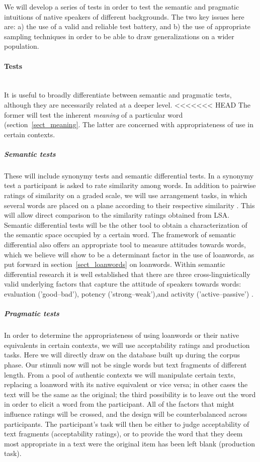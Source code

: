 \documentclass[a4paper]{article}
\begin{document}
We will develop a series of tests in order to test the semantic and pragmatic intuitions of native speakers of different backgrounds.
The two key issues here are: a) the use of a valid and reliable test battery, and b) the use of appropriate sampling techniques in order to be able to draw generalizations on a wider population.

\paragraph{Tests}
\hspace{0pt} \\
It is useful to broadly differentiate between semantic and pragmatic tests, although they are necessarily related at a deeper level.
<<<<<<< HEAD
The former will test the inherent \emph{meaning} of a particular word (section~\ref{sect_meaning}. 
The latter are concerned with appropriateness of use in certain contexts.

\subparagraph{Semantic tests}
These will include synonymy tests and semantic differential tests.
In a synonymy test a participant is asked to rate similarity among words.
In addition to pairwise ratings of similarity on a graded scale, we will use arrangement tasks, in which several words are placed on a plane according to their respective similarity \citep{Goldstone1994, Kriegeskorte2012}.
This will allow direct comparison to the similarity ratings obtained from LSA.
Semantic differential tests \citep{Osgood1957} will be the other tool to obtain a characterization of the semantic space occupied by a certain word.
The framework of semantic differential also offers an appropriate tool to measure attitudes towards words, which we believe will show to be a determinant factor in the use of loanwords, as put forward in section~\ref{sect_loanwords} on loanwords.
Within semantic differential research it is well established that there are three cross-linguistically valid underlying factors that capture the attitude of speakers towards words: evaluation ('good--bad'), potency ('strong--weak'),and activity ('active--passive') \citep[see][]{Heise2010}.

\subparagraph{Pragmatic tests}
In order to determine the appropriateness of using loanwords or their native equivalents in certain contexts, we will use acceptability ratings and production tasks.
Here we will directly draw on the database built up during the corpus phase.
Our stimuli now will not be single words but text fragments of different length.
From a pool of authentic contexts we will manipulate certain texts, replacing a loanword with its native equivalent or vice versa; in other cases the text will be the same as the original; the third possibility is to leave out the word in order to elicit a word from the participant.
All of the factors that might influence ratings will be crossed, and the design will be counterbalanced across participants.
The participant's task will then be either to judge acceptability of text fragments (acceptability ratings), or to provide the word that they deem most appropriate in a text were the original item has been left blank (production task).
\end{document}
